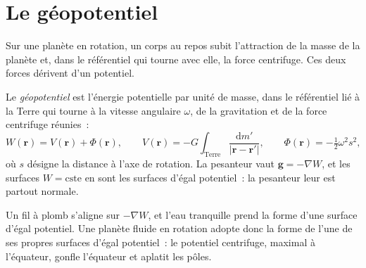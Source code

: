 \section{Le géopotentiel}

Sur une planète en rotation, un corps au repos subit l'attraction de la masse de la planète et,
dans le référentiel qui tourne avec elle, la force centrifuge. Ces deux forces dérivent d'un
potentiel.

\begin{definition}[Géopotentiel]\label{def:b3:gravity-geodesy:geopotential}
Le \emph{géopotentiel} est l'énergie potentielle par unité de masse,
dans le référentiel lié à la Terre qui tourne à la vitesse angulaire $\omega$, de la gravitation
et de la force centrifuge réunies~:
\[
  W(\mathbf r) = V(\mathbf r) + \Phi(\mathbf r),\qquad
  V(\mathbf r) = -G\int_{\text{Terre}}\frac{\mathrm dm'}{|\mathbf r - \mathbf r'|},\qquad
  \Phi(\mathbf r) = -\tfrac12\omega^2 s^2,
\]
où $s$ désigne la distance à l'axe de rotation. La pesanteur vaut
$\mathbf g = -\nabla W$, et les surfaces $W = \text{cste}$ en sont les surfaces
d'égal potentiel~: la pesanteur leur est partout normale.
\end{definition}

Un fil à plomb s'aligne sur $-\nabla W$, et l'eau tranquille prend la forme d'une surface
d'égal potentiel. Une planète fluide en rotation adopte donc la forme de l'une de ses propres
surfaces d'égal potentiel~: le potentiel centrifuge, maximal à l'équateur, gonfle l'équateur
et aplatit les pôles.

